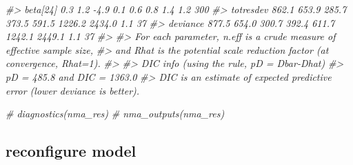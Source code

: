 \documentclass[
]{article}
\newenvironment{Shaded}{\begin{snugshade}}{\end{snugshade}}
\newcommand{\CommentTok}[1]{\textcolor[rgb]{0.56,0.35,0.01}{\textit{#1}}}
\begin{document}
\begin{Shaded}
\begin{Highlighting}[]
\CommentTok{\#\textgreater{} beta[24]    0.3   1.2  {-}4.9   0.1   0.6    0.8    1.4  1.2   300}
\CommentTok{\#\textgreater{} totresdev 862.1 653.9 285.7 373.5 591.5 1226.2 2434.0  1.1    37}
\CommentTok{\#\textgreater{} deviance  877.5 654.0 300.7 392.4 611.7 1242.1 2449.1  1.1    37}
\CommentTok{\#\textgreater{} }
\CommentTok{\#\textgreater{} For each parameter, n.eff is a crude measure of effective sample size,}
\CommentTok{\#\textgreater{} and Rhat is the potential scale reduction factor (at convergence, Rhat=1).}
\CommentTok{\#\textgreater{} }
\CommentTok{\#\textgreater{} DIC info (using the rule, pD = Dbar{-}Dhat)}
\CommentTok{\#\textgreater{} pD = 485.8 and DIC = 1363.0}
\CommentTok{\#\textgreater{} DIC is an estimate of expected predictive error (lower deviance is better).}

\CommentTok{\# diagnostics(nma\_res)}
\CommentTok{\# nma\_outputs(nma\_res)}
\end{Highlighting}
\end{Shaded}

\hypertarget{reconfigure-model}{%
\subsection{reconfigure model}\label{reconfigure-model}}
\end{document}
